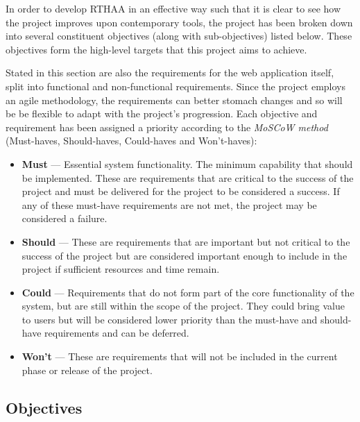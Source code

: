 \documentclass[12pt, a4paper]{article}
\newcommand{\np}
    {
    \vskip 0.4cm
    }
\begin{document}

In order to develop RTHAA in an effective way such that it is clear to see how the project improves upon contemporary tools, the project has been broken down into several constituent objectives (along with sub-objectives) listed below. These objectives form the high-level targets that this project aims to achieve.
\np
Stated in this section are also the requirements for the web application itself, split into functional and non-functional requirements. Since the project employs an agile methodology, the requirements can better stomach changes and so will be be flexible to adapt with the project's progression. Each objective and requirement has been assigned a priority according to the \textit{MoSCoW method} (Must-haves, Should-haves, Could-haves and Won't-haves):

\begin{itemize}
    \item \textbf{Must} --- Essential system functionality. The minimum capability that should be implemented. These are requirements that are critical to the success of the project and must be delivered for the project to be considered a success. If any of these must-have requirements are not met, the project may be considered a failure.
    
    \item \textbf{Should} --- These are requirements that are important but not critical to the success of the project but are considered important enough to include in the project if sufficient resources and time remain.
    
    \item \textbf{Could} --- Requirements that do not form part of the core functionality of the system, but are still within the scope of the project. They could bring value to users but will be considered lower priority than the must-have and should-have requirements and can be deferred.
    
    \item \textbf{Won't} --- These are requirements that will not be included in the current phase or release of the project.
\end{itemize}



\subsection{Objectives}
\end{document}

